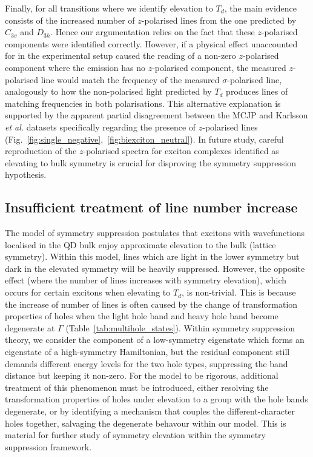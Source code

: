 Finally, for all transitions where we identify elevation to $T_d$, the main evidence consists of the increased number of $z$-polarised lines from the one predicted by $C_{3v}$ and $D_{3h}$. Hence our argumentation relies on the fact that these $z$-polarised components were identified correctly. However, if a physical effect unaccounted for in the experimental setup caused the reading of a non-zero $z$-polarised component where the emission has no $z$-polarised component, the measured $z$-polarised line would match the frequency of the measured $\sigma$-polarised line, analogously to how the non-polarised light predicted by $T_d$ produces lines of matching frequencies in both polarisations. This alternative explanation is supported by the apparent partial disagreement between the MCJP and Karlsson \textit{et al.} datasets specifically regarding the presence of $z$-polarised lines (Fig.~\ref{fig:single_negative},~\ref{fig:biexciton_neutral}). In future study, careful reproduction of the $z$-polarised spectra for exciton complexes identified as elevating to bulk symmetry is crucial for disproving the symmetry suppression hypothesis.

\subsection{Insufficient treatment of line number increase} \label{sec:failed_degeneracy}
The model of symmetry suppression postulates that excitons with wavefunctions localised in the QD bulk enjoy approximate elevation to the bulk (lattice symmetry). Within this model, lines which are light in the lower symmetry but dark in the elevated symmetry will be heavily suppressed. However, the opposite effect (where the number of lines increases with symmetry elevation), which occurs for certain excitons when elevating to $T_d$, is non-trivial. This is because the increase of number of lines is often caused by the change of transformation properties of holes when the light hole band and heavy hole band become degenerate at $\Gamma$ (Table~\ref{tab:multihole_states}). Within symmetry suppression theory, we consider the component of a low-symmetry eigenstate which forms an eigenstate of a high-symmetry Hamiltonian, but the residual component still demands different energy levels for the two hole types, suppressing the band distance but keeping it non-zero. For the model to be rigorous, additional treatment of this phenomenon must be introduced, either resolving the transformation properties of holes  under elevation to a group with the hole bands degenerate, or by identifying a mechanism that couples the different-character holes together, salvaging the degenerate behavour within our model. This is material for further study of symmetry elevation within the symmetry suppression framework.

